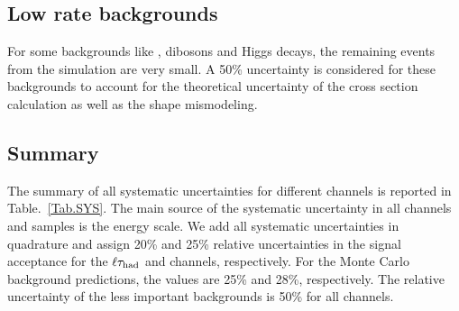 \subsection{Low rate backgrounds} For some backgrounds like \ttbar, dibosons and Higgs decays, the remaining 
events from the simulation are very small. A 50\% uncertainty is considered for these backgrounds to account for the theoretical uncertainty of the
cross section calculation as well as the shape mismodeling.

\subsection{Summary}
The summary of all systematic uncertainties for different channels is reported in Table.~\ref{Tab.SYS}. The main source of the systematic uncertainty in all channels and samples is the \hadtau energy scale.  We add all systematic uncertainties in quadrature and assign 
 20\% and 25\% relative uncertainties in the signal
acceptance for the $\ell\tau_{\rm had}$ and \tauTau channels, respectively. For the Monte Carlo background predictions, the values are 
25\% and 28\%, respectively. The relative uncertainty of the less important backgrounds is 50\% for all channels.


